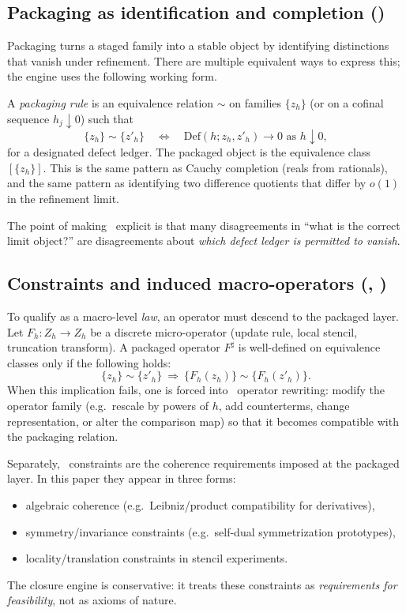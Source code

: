 \subsection{Packaging as identification and completion (\Pfive)}
Packaging turns a staged family into a stable object by identifying distinctions that vanish under refinement.
There are multiple equivalent ways to express this; the engine uses the following working form.

A \emph{packaging rule} is an equivalence relation $\sim$ on families $\{z_h\}$ (or on a cofinal sequence $h_j\downarrow 0$) such that
\[
\{z_h\}\sim \{z'_h\}
\quad\Longleftrightarrow\quad
\mathrm{Def}(h;z_h,z'_h)\to 0
\text{ as }h\downarrow 0,
\]
for a designated defect ledger.
The packaged object is the equivalence class $[\{z_h\}]$.
This is the same pattern as Cauchy completion (reals from rationals), and the same pattern as identifying two difference quotients that differ by $o(1)$ in the refinement limit.

The point of making \Pfive\ explicit is that many disagreements in ``what is the correct limit object?'' are disagreements about \emph{which defect ledger is permitted to vanish}.

\subsection{Constraints and induced macro-operators (\Ptwo, \Pone)}
To qualify as a macro-level \emph{law}, an operator must descend to the packaged layer.
Let $F_h:Z_h\to Z_h$ be a discrete micro-operator (update rule, local stencil, truncation transform).
A packaged operator $F^\sharp$ is well-defined on equivalence classes only if the following holds:
\[
\{z_h\}\sim \{z'_h\}
\ \Longrightarrow\
\{F_h(z_h)\}\sim \{F_h(z'_h)\}.
\]
When this implication fails, one is forced into \Pone\ operator rewriting:
modify the operator family (e.g.\ rescale by powers of $h$, add counterterms, change representation, or alter the comparison map) so that it becomes compatible with the packaging relation.

Separately, \Ptwo\ constraints are the coherence requirements imposed at the packaged layer.
In this paper they appear in three forms:
\begin{itemize}
  \item algebraic coherence (e.g.\ Leibniz/product compatibility for derivatives),
  \item symmetry/invariance constraints (e.g.\ self-dual symmetrization prototypes),
  \item locality/translation constraints in stencil experiments.
\end{itemize}
The closure engine is conservative: it treats these constraints as \emph{requirements for feasibility}, not as axioms of nature.

